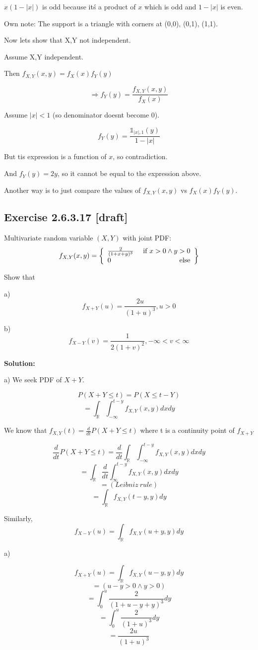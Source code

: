 \documentclass{article}
\begin{document}
\(x(1-|x|)\) is odd because it\'s a product of \(x\) which is odd and \(1-|x|\) is even.

Own note: The support is a triangle with corners at (0,0), (0,1), (1,1).

Now lets show that X,Y not independent.

Assume X,Y independent.

Then \(f_{X,Y}(x,y)=f_X(x)f_Y(y)\)

\[\Rightarrow f_Y(y)=\frac{f_{X,Y}(x,y)}{f_X(x)}\]

Assume \(|x|<1\) (so denominator doesnt become 0).

\[f_Y(y)=\frac{\mathds{1}_{|x|, 1}(y)}{1-|x|}\]

But tis expression is a function of \(x\), so contradiction.

And \(f_Y(y)=2y\), so it cannot be equal to the expression above.

Another way is to just compare the values of \(f_{X,Y}(x,y)\) vs \(f_X(x)f_Y(y)\).

\subsection{Exercise 2.6.3.17 [draft]}

Multivariate random variable \((X,Y)\) with joint PDF:
\[f_{X,Y}(x,y)=\left\{\begin{array}{lr}\frac{2}{(1+x+y)^3} & \text{ if }x>0\wedge y>0\\0 & \text{ else}\end{array}\right\}\]

Show that

a)
\[f_{X+Y}(u)=\frac{2u}{(1+u)^3}, u>0\]

b)
\[f_{X-Y}(v)=\frac{1}{2(1+v)^2},-\infty<v<\infty\]

\textbf{Solution:}

a)
We seek PDF of \(X+Y\).

\[P(X+Y\leq t)=P(X\leq t-Y)\]
\[=\int_\mathbb{R}\int_{-\infty}^{t-y} f_{X,Y}(x,y)dxdy\]

We know that \(f_{X,Y}(t)=\frac{d}{dt}P(X+Y\leq t)\)
where t is a continuity point of \(f_{X+Y}\)

\[\frac{d}{dt} P(X+Y\leq t)=\frac{d}{dt}\int_\mathbb{R}\int_{-\infty}^{t-y} f_{X,Y}(x,y)dxdy\]
\[=\int_\mathbb{R} \frac{d}{dt}\int_{\infty}^{t-y} f_{X,Y}(x,y)dxdy\]
\[=(Leibniz\ rule)\]
\[=\int_\mathbb{R} f_{X,Y}(t-y,y)dy\]

Similarly,
\[f_{X-Y}(u)=\int_\mathbb{R} f_{X,Y}(u+y,y)dy\]

a)

\[f_{X+Y}(u) = \int_\mathbb{R} f_{X,Y}(u-y,y)dy\]
\[=(u-y>0 \wedge y>0)\]
\[=\int_0^u \frac{2}{(1+u-y+y)^3}dy\]
\[=\int_0^u \frac{2}{(1+u)^3}dy\]
\[=\frac{2u}{(1+u)^3}\]
\end{document}
